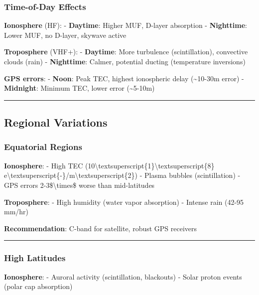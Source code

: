 \subsubsection{Time-of-Day Effects}\label{time-of-day-effects}

\textbf{Ionosphere} (HF): - \textbf{Daytime}: Higher MUF, D-layer
absorption - \textbf{Nighttime}: Lower MUF, no D-layer, skywave active

\textbf{Troposphere} (VHF+): - \textbf{Daytime}: More turbulence
(scintillation), convective clouds (rain) - \textbf{Nighttime}: Calmer,
potential ducting (temperature inversions)

\textbf{GPS errors}: - \textbf{Noon}: Peak TEC, highest ionospheric
delay (\textasciitilde10-30m error) - \textbf{Midnight}: Minimum TEC,
lower error (\textasciitilde5-10m)

\begin{center}\rule{0.5\linewidth}{0.5pt}\end{center}

\subsection{Regional Variations}\label{regional-variations}

\subsubsection{Equatorial Regions}\label{equatorial-regions}

\textbf{Ionosphere}: - High TEC
(10\textbackslash textsuperscript\{1\}\textbackslash textsuperscript\{8\}
e\textbackslash textsuperscript\{-\}/m\textbackslash textsuperscript\{2\})
- Plasma bubbles (scintillation) - GPS errors
2-3\$\textbackslash times\$ worse than mid-latitudes

\textbf{Troposphere}: - High humidity (water vapor absorption) - Intense
rain (42-95 mm/hr)

\textbf{Recommendation}: C-band for satellite, robust GPS receivers

\begin{center}\rule{0.5\linewidth}{0.5pt}\end{center}

\subsubsection{High Latitudes}\label{high-latitudes}

\textbf{Ionosphere}: - Auroral activity (scintillation, blackouts) -
Solar proton events (polar cap absorption)


